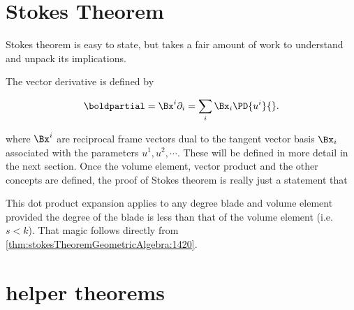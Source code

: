 %
%
\section{Stokes Theorem}

Stokes theorem is easy to state, but takes a fair amount of work to understand and unpack its implications.


The vector derivative is defined by

\begin{equation}\label{eqn:stokesTheoremGeometricAlgebra:1400}
\boldpartial = \Bx^i \partial_i = \sum_i \Bx_i \PD{u^i}{}.
\end{equation}

where \( \Bx^i \) are reciprocal frame vectors dual to the tangent vector basis \( \Bx_i \) associated with the parameters \( u^1, u^2, \cdots \).  These will be defined in more detail in the next section.  Once the volume element, vector product and the other concepts are defined, the proof of
Stokes theorem is really just a statement that


This dot product expansion applies to any degree blade and volume element provided the degree of the blade is less than that of the volume element (i.e. \(s < k\)).  That magic follows directly from \cref{thm:stokesTheoremGeometricAlgebra:1420}.

\section{helper theorems}


